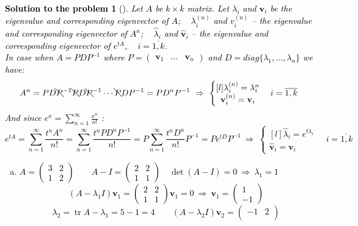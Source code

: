 \documentclass[12pt,a4]{article}
\newtheorem{solution}{Solution to the problem}
\newcommand\trace{\operatorname{tr}}
\newcommand{\bv}{{\mathbf v}}
\begin{document}
\textcolor{black}{
\begin{solution}[]\rm Let $A$ be $k \times k$ matrix.
Let $\lambda_i$ and $\bv_i$ be the eigenvalue and corresponding eigenvector of $A$; ~ $\lambda^{(n)}_i$ and $v^{(n)}_i$ -- the eigenvalue and corresponding eigenvector of $A^n$; ~ $\hat \lambda_i$ and $\hat \bv_i$ -- the eigenvalue and corresponding eigenvector of $e^{tA}$, ~ $i=\overline{1,k}$. \\[2pt]
In case when $A = PDP^{-1}$ where
$P = \begin{pmatrix} \bv_1 & \dots & \bv_n \end{pmatrix}$ 
and
$D = diag\{\lambda_1, \dots ,\lambda_n\}$
we have:
\[
A^n = PD\bcancel{P}^{-1}\bcancel{P}D\bcancel{P}^{-1}\cdots\bcancel{P}DP^{-1} = PD^nP^{-1}
~ \Rightarrow ~
\left \{ \begin{matrix}[l]
\lambda^{(n)}_i = \lambda_i^n \\
\bv^{(n)}_i = \bv_i
\end{matrix} \right.
\quad i=\overline{1,k}
\]
And since $e^x = \sum_{n=1}^\infty \frac{x^n}{n!}$ :
\[
e^{tA} = \sum_{n=1}^\infty \frac{t^n A^n}{n!}
= \sum_{n=1}^\infty \frac{t^nPD^nP^{-1}}{n!}
= P \sum_{n=1}^\infty \frac{t^nD^n}{n!} P^{-1}
= P e^{tD} P^{-1}
~ \Rightarrow ~
\left \{ \begin{matrix}[l]
\hat \lambda_i = e^{t\lambda_i} \\
\hat \bv_i = \bv_i
\end{matrix} \right.
\quad i=\overline{1,k}
\]
\begin{enumerate}[(a)]
\item $A = 
\begin{pmatrix}
3 & 2 \\
1 & 2
\end{pmatrix}
\qquad
A - I = 
\begin{pmatrix}
2 & 2 \\
1 & 1
\end{pmatrix}
\quad
\det (A - I) = 0
~ \Rightarrow ~
\lambda_1 = 1
$
\[
(A - \lambda_1 I) \bv_1 =
\begin{pmatrix}
2 & 2 \\
1 & 1
\end{pmatrix}
\bv_1 = 0
~ \Rightarrow ~
\bv_1 = \begin{pmatrix} 1 \\ -1 \end{pmatrix}
\]
\[
\lambda_2 = \trace A - \lambda_1 = 5 - 1 = 4
\qquad
(A - \lambda_2 I) \bv_2 =
\begin{pmatrix}
-1 & 2 \\

\end{pmatrix}\]
\end{enumerate}
\end{solution}}
\end{document}
